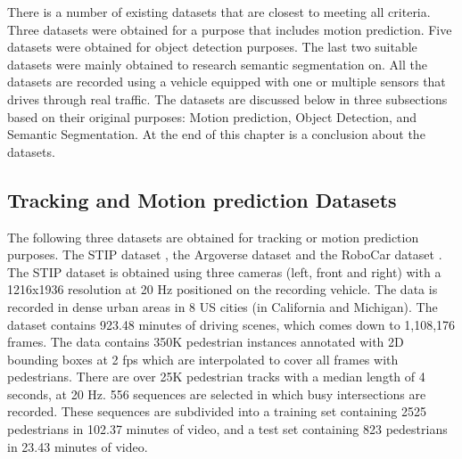 
There is a number of existing datasets that are closest to meeting all criteria. Three datasets were obtained for a purpose that includes motion prediction. Five datasets were obtained for object detection purposes. The last two suitable datasets were mainly obtained to research semantic segmentation on. All the datasets are recorded using a vehicle equipped with one or multiple sensors that drives through real traffic. The datasets are discussed below in three subsections based on their original purposes: Motion prediction, Object Detection, and Semantic Segmentation. At the end of this chapter is a conclusion about the datasets.


\subsection{Tracking and Motion prediction Datasets}
The following three datasets are obtained for tracking or motion prediction purposes. The \gls{STIP} dataset \cite{liu2020spatiotemporal}, the Argoverse dataset \cite{chang2019argoverse} and the RoboCar dataset \cite{robotcardatasetijrr}. \\

The \gls{STIP} dataset \cite{liu2020spatiotemporal} is obtained using three cameras (left, front and right) with a 1216x1936 resolution at 20 Hz positioned on the recording vehicle. The data is recorded in dense urban areas in 8 US cities (in California and Michigan). The dataset contains 923.48 minutes of driving scenes, which comes down to 1,108,176 frames. The data contains 350K pedestrian instances annotated with 2D bounding boxes at 2 fps which are interpolated to cover all frames with pedestrians. There are over 25K pedestrian tracks with a median length of 4 seconds, at 20 Hz. 556 sequences are selected in which busy intersections are recorded. These sequences are subdivided into a training set containing 2525 pedestrians in 102.37 minutes of video, and a test set containing 823 pedestrians in 23.43 minutes of video. \\

